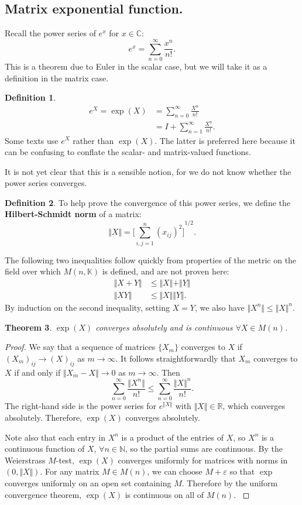 \documentclass[12pt]{article}
\newcommand{\C}{\mathbb{C}}
\newcommand{\R}{\mathbb{R}}
\newcommand{\N}{\mathbb{N}}
\newcommand{\K}{\mathbb{K}}
\newcommand{\V}{\Vert}
\newtheorem{them}{Theorem}[section]
\theoremstyle{definition}
\theoremstyle{definition}
\theoremstyle{definition}
\theoremstyle{definition}
\theoremstyle{definition}
\newtheorem{defn}[them]{Definition}
\theoremstyle{definition}
\theoremstyle{definition}
\theoremstyle{definition}
\begin{document}
\subsection{Matrix exponential function.}
\par{
Recall the power series of $e^x$ for $x \in \C$:
\[
    e^x = \sum_{n=0}^{\infty}\frac{x^n}{n!}.
\] This is a theorem due to Euler in the scalar case, but we will take it as a definition in the matrix case.}
\begin{defn}
\[\begin{aligned} e^X = \exp(X) & =
\sum_{n=0}^{\infty}\frac{X^n}{n!} \\ & = I +
\sum_{n=1}^{\infty}\frac{X^n}{n!}.
\end{aligned}\] Some texts use $e^X$ rather
than $\exp(X)$. The latter is preferred here
because it can be confusing to conflate the
scalar- and matrix-valued functions.
\end{defn}
\par{It is not yet clear that this is a sensible
notion, for we do not know whether the power
series converges.}
\begin{defn}
To help prove the convergence of this power series, we
define the \textbf{Hilbert-Schmidt norm} of a
matrix:
\[
    \V X \V = {\Big[\sum_{i,j=1}^{n}{(x_{ij})}^2 \Big]}^{1/2}.
\]
\end{defn} 
\par{The following two inequalities follow quickly
from properties of the metric on the field over
which $M(n, \K)$ is defined, and are not proven here:
\[\begin{aligned}
    \V X + Y \V & \leq \V X \V + \V Y \V \\
    \V XY \V & \leq \V X \V \V Y \V.
\end{aligned}
\] By induction on the second inequality, setting $X =
Y$, we also
have $\V X^n \V \leq \V X \V^n$.}
\begin{them} $\exp(X)$ converges absolutely and is
continuous
$\forall X \in M(n)$.
\end{them}
\begin{proof}
\par{
    We say that a sequence of matrices $\{X_m\}$
    converges to $X$ if ${(X_m)}_{ij} \to (X)_{ij}$
    as $m \to \infty$. It follows
    straightforwardly that $X_m$ converges to $X$
    if and only if $\V X_m - X \V \to 0$ as $m \to
    \infty$. Then 
\[
    \sum_{n=0}^{\infty}\frac{\V X^n\V}{n!} \leq \sum_{n=0}^\infty \frac{\V X \V^n}{n!}.
\] The right-hand side is the power series for $e^{\V X \V}$ with $\V X \V \in \R$, which converges absolutely. Therefore, $\exp(X)$ converges absolutely.
}
\par{
Note also that each entry in $X^n$ is a product of
the entries of $X$, so $X^n$ is a continuous
function of $X$, $\forall n \in \N$, so the
partial sums are continuous. By the Weierstrass
$M$-test, $\exp(X)$ converges uniformly for
matrices with norms in $(0, \V X \V)$. For any
matrix $M \in M(n)$, we can choose $M +
\varepsilon$ so that $\exp$ converges uniformly on
an open set containing $M$. Therefore by the
uniform convergence theorem, $\exp(X)$ is
continuous on all of $M(n)$.
}
\end{proof}
\end{document}
